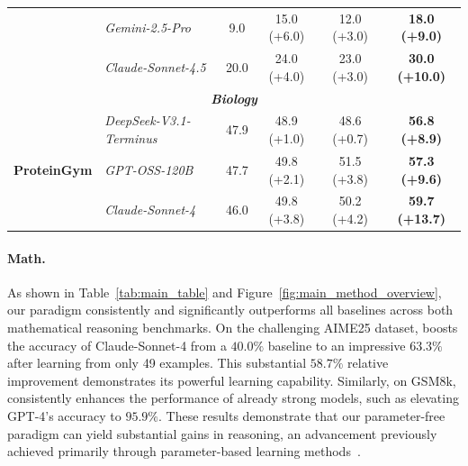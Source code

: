 \begin{table}[!t]
{\begin{tabular}{llcccc}
& \textit{Gemini-2.5-Pro}~\cite{google2025gemini2_5_pro} & 9.0 & 15.0 (\textcolor{blue!80}{+6.0}) & 12.0 (\textcolor{blue!80}{+3.0}) & \textbf{18.0 (\textcolor{blue!80}{+9.0})}  \\
& \textit{Claude-Sonnet-4.5}~\cite{anthropic2025sonnet4.5} & 20.0 & 24.0 (\textcolor{blue!80}{+4.0}) & 23.0 (\textcolor{blue!80}{+3.0}) & \textbf{30.0 (\textcolor{blue!80}{+10.0})}  \\
\midrule
\multicolumn{6}{c}{\textit{\textbf{Biology}}} \\
\midrule
\midrule
\multirow{3}{*}{\textbf{ProteinGym}} & \textit{DeepSeek-V3.1-Terminus}~\cite{DeepSeekV3.1Terminus} & 47.9 & 48.9 (\textcolor{blue!80}{+1.0}) & 48.6 (\textcolor{blue!80}{+0.7}) & \textbf{56.8 (\textcolor{blue!80}{+8.9})} \\
& \textit{GPT-OSS-120B}~\cite{openai2025gptoss120bgptoss20bmodel} & 47.7 & 49.8 (\textcolor{blue!80}{+2.1}) & 51.5 (\textcolor{blue!80}{+3.8}) & \textbf{57.3 (\textcolor{blue!80}{+9.6})}  \\
& \textit{Claude-Sonnet-4}~\cite{anthropic2025claude4} & 46.0 & 49.8 (\textcolor{blue!80}{+3.8}) & 50.2 (\textcolor{blue!80}{+4.2}) & \textbf{59.7 (\textcolor{blue!80}{+13.7})}  \\
\bottomrule
\end{tabular}
}
\end{table}


\paragraph{Math.} As shown in Table~\ref{tab:main_table} and Figure~\ref{fig:main_method_overview}, our \method{} paradigm consistently and significantly outperforms all baselines across both mathematical reasoning benchmarks. On the challenging AIME25 dataset, \method{} boosts the accuracy of Claude-Sonnet-4 from a $40.0\%$ baseline to an impressive $63.3\%$ after learning from only 49 examples. This substantial $58.7\%$ relative improvement demonstrates its powerful learning capability. Similarly, on GSM8k, \method{} consistently enhances the performance of already strong models, such as elevating GPT-4's accuracy to $95.9\%$. These results demonstrate that our parameter-free paradigm can yield substantial gains in reasoning, an advancement previously achieved primarily through parameter-based learning methods~\cite{deepseekai2025deepseekr1incentivizingreasoningcapability,yu2025dapoopensourcellmreinforcement}.

